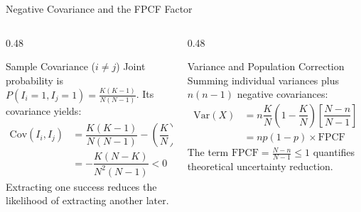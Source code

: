 \documentclass[aspectratio=169,xcolor={dvipsnames,table}]{beamer}
\begin{document}
\begin{frame}{Negative Covariance and the FPCF Factor}
	\vspace{-0.15cm}
	\begin{columns}[T]
		\begin{column}{0.48\textwidth}
			\begin{block}{Sample Covariance ($i \neq j$)}
				\scriptsize
				Joint probability is $P(I_i=1, I_j=1) = \frac{K(K-1)}{N(N-1)}$. Its covariance yields:
				\begin{align*}
					\text{Cov}(I_i, I_j) &= \dfrac{K(K-1)}{N(N-1)} - \left(\dfrac{K}{N}\right)^2 \\
					&= -\dfrac{K(N-K)}{N^2(N-1)} < 0
				\end{align*}
				Extracting one success reduces the likelihood of extracting another later.
			\end{block}
		\end{column}
		\begin{column}{0.48\textwidth}
			\begin{exampleblock}{Variance and Population Correction}
				\scriptsize
				Summing individual variances plus $n(n-1)$ negative covariances:
				\begin{align*}
					\text{Var}(X) &= n\dfrac{K}{N}\left(1-\dfrac{K}{N}\right) \left[ \dfrac{N-n}{N-1} \right] \\
					&= np(1-p) \times \text{FPCF}
				\end{align*}
				\vspace{-0.25cm}
				The term $\text{FPCF} = \frac{N-n}{N-1} \le 1$ quantifies theoretical uncertainty reduction.
			\end{exampleblock}
		\end{column}
	\end{columns}
\end{frame}
\end{document}
